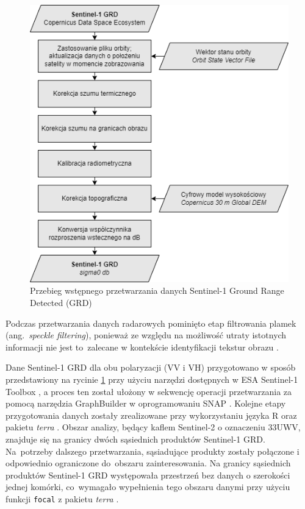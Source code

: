 \documentclass{amuthesis}
\begin{document}
\begin{figure}[t]

{\centering \includegraphics[width=4.6875in,height=\textheight]{figures/sentinel1_workflow.drawio.png}

}

\caption{\label{fig-rycina-s1-workflow}Przebieg wstępnego przetwarzania
danych Sentinel-1 Ground Range Detected (GRD)}

\end{figure}

Podczas przetwarzania danych radarowych pominięto etap filtrowania
plamek (ang.~\emph{speckle filtering}), ponieważ ze względu na możliwość
utraty istotnych informacji nie jest to~zalecane w kontekście
identyfikacji tekstur obrazu \autocite{filipponi_2019_s1_workflow}.

Dane Sentinel-1 GRD dla obu polaryzacji (VV i VH) przygotowano w sposób
przedstawiony na rycinie \ref{fig-rycina-s1-workflow} przy użyciu
narzędzi dostępnych w ESA Sentinel-1 Toolbox \autocite{s1tbx}, a proces
ten został ułożony w sekwencję operacji przetwarzania za pomocą
narzędzia GraphBuilder w oprogramowaniu SNAP \autocite{snap}. Kolejne
etapy przygotowania danych zostały zrealizowane przy wykorzystaniu
języka R \autocite{R-base} oraz pakietu \emph{terra} \autocite{R-terra}.
Obszar analizy, będący kaflem Sentinel-2 o oznaczeniu 33UWV, znajduje
się na granicy dwóch sąsiednich produktów Sentinel-1 GRD. Na~potrzeby
dalszego przetwarzania, sąsiadujące produkty zostały połączone i
odpowiednio ograniczone do~obszaru zainteresowania. Na granicy
sąsiednich produktów Sentinel-1 GRD występowała przestrzeń bez danych o
szerokości jednej komórki, co~wymagało wypełnienia tego obszaru danymi
przy użyciu funkcji \texttt{focal} z pakietu \emph{terra}
\autocite{R-terra}.
\end{document}
